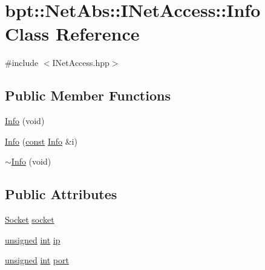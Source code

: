 \hypertarget{classbpt_1_1_net_abs_1_1_i_net_access_1_1_info}{\section{bpt\-:\-:Net\-Abs\-:\-:I\-Net\-Access\-:\-:Info Class Reference}
\label{classbpt_1_1_net_abs_1_1_i_net_access_1_1_info}
}


{\ttfamily \#include $<$I\-Net\-Access.\-hpp$>$}

\subsection*{Public Member Functions}
\begin{DoxyCompactItemize}
\item 
\hyperlink{classbpt_1_1_net_abs_1_1_i_net_access_1_1_info_a5d96489efe951122cb383f2b3c0ce3d0}{Info} (void)
\item 
\hyperlink{classbpt_1_1_net_abs_1_1_i_net_access_1_1_info_a3626d5013e824fc1280425e8ee9971c8}{Info} (\hyperlink{term__entry_8h_a57bd63ce7f9a353488880e3de6692d5a}{const} \hyperlink{classbpt_1_1_net_abs_1_1_i_net_access_1_1_info}{Info} \&i)
\item 
\hyperlink{classbpt_1_1_net_abs_1_1_i_net_access_1_1_info_a66f995eaa45d1795486285b134becb87}{$\sim$\-Info} (void)
\end{DoxyCompactItemize}
\subsection*{Public Attributes}
\begin{DoxyCompactItemize}
\item 
\hyperlink{classbpt_1_1_net_abs_1_1_i_net_access_ae5a8cad46f8006b85b535f126b697efc}{Socket} \hyperlink{classbpt_1_1_net_abs_1_1_i_net_access_1_1_info_a74e72bcc0638bc083800a39fa107073d}{socket}
\item 
\hyperlink{curses_8priv_8h_aca40206900cfc164654362fa8d4ad1e6}{unsigned} \hyperlink{term__entry_8h_ad65b480f8c8270356b45a9890f6499ae}{int} \hyperlink{classbpt_1_1_net_abs_1_1_i_net_access_1_1_info_a80f38b113662022cefe16eec15d0a3f5}{ip}
\item 
\hyperlink{curses_8priv_8h_aca40206900cfc164654362fa8d4ad1e6}{unsigned} \hyperlink{term__entry_8h_ad65b480f8c8270356b45a9890f6499ae}{int} \hyperlink{classbpt_1_1_net_abs_1_1_i_net_access_1_1_info_a46d84541ee22bb069c42ea79a5f0b601}{port}
\end{DoxyCompactItemize}


